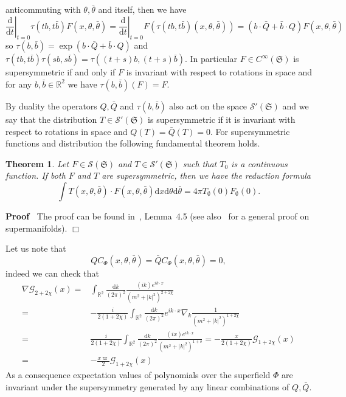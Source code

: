 \documentclass[a4paper,10pt]{article}
\newcommand{\mathd}{\mathrm{d}}
\newenvironment{proof}{\noindent\textbf{Proof\ }}{\hspace*{\fill}$\Box$\medskip}
\newtheorem{theorem}{Theorem}
\begin{document}
anticommuting with $\theta, \bar{\theta}$ and itself, then we have
\[ \left. \frac{\mathd}{\mathd t} \right|_{t = 0} \tau (t b, t \bar{b}) F (x,
   \theta, \bar{\theta}) = \left. \frac{\mathd}{\mathd t} \right|_{t = 0} F
   (\tau (t b, t \bar{b}) (x, \theta, \bar{\theta})) = (b \cdot \bar{Q} +
   \bar{b} \cdot Q) F (x, \theta, \bar{\theta}) \]
so $\tau (b, \bar{b}) = \exp (b \cdot \bar{Q} + \bar{b} \cdot Q)$ and $\tau (t
b, t \bar{b}) \tau (s b, s \bar{b}) = \tau ((t + s) b, (t + s) \bar{b})$. In
particular $F \in C^{\infty} (\mathfrak{S})$ is supersymmetric if and only if
$F$ is invariant with respect to rotations in space and for any $b, \bar{b}
\in \mathbb{R}^2$ we have $\tau (b, \bar{b}) (F) = F$.

By duality the operators $Q, \bar{Q}$ and $\tau (b, \bar{b})$ also act  on the
space $\mathcal{S}' (\mathfrak{S})$ and we say that the distribution $T \in
\mathcal{S}' (\mathfrak{S})$ is supersymmetric if it is invariant with respect
to rotations in space and $Q (T) = \bar{Q} (T) = 0$. For supersymmetric
functions and distribution the following fundamental theorem holds.

\begin{theorem}
  \label{theorem_supersymmetry1}Let $F \in \mathcal{S} (\mathfrak{S})$ and $T
  \in \mathcal{S}' (\mathfrak{S})$ such that $T_0$ is a continuous function.
  If both $F$ and $T$ are supersymmetric, then we have the reduction formula
  \begin{equation}
    \int T (x, \theta, \bar{\theta}) \cdot F (x, \theta, \bar{\theta}) \mathd
    x \mathd \theta \mathd \bar{\theta} = 4 \pi T_{\emptyset} (0)
    F_{\emptyset} (0) . \label{eq:key}
  \end{equation}
\end{theorem}

\begin{proof}
  The proof can be found in~{\cite{Klein1984}}, Lemma~4.5 (see
  also~{\cite{Zaboronsky1997}} for a general proof on supermanifolds).
\end{proof}

Let us note that
\[ Q C_{\Phi} (x, \theta, \bar{\theta}) = \bar{Q} C_{\Phi} (x, \theta,
   \bar{\theta}) = 0, \]
indeed we can check that
\begin{align*}
  \nabla \mathcal{G}_{2 + 2 \chi} (x) = & \int_{\mathbb{R}^2} \frac{\mathd
  k}{(2 \pi)^2}  \frac{(i k) e^{i k \cdot x}}{(m^2 + | k |^2)^{2 + 2 \chi}}\\
  = & - \frac{i}{2 (1 + 2 \chi)} \int_{\mathbb{R}^2} \frac{\mathd k}{(2
  \pi)^2} e^{i k \cdot x} \nabla_k  \frac{1}{(m^2 + | k |^2)^{1 + 2 \chi}}\\
  = & \frac{i}{2 (1 + 2 \chi)} \int_{\mathbb{R}^2} \frac{\mathd k}{(2 \pi)^2} 
  \frac{(i x) e^{i k \cdot x}}{(m^2 + | k |^2)^{1 + \delta}} = - \frac{x}{2 (1
  + 2 \chi)} \mathcal{G}_{1 + 2 \chi} (x)\\
  = & - \frac{x \varpi}{2} \mathcal{G}_{1 + 2 \chi} (x)
\end{align*}
As a consequence expectation values of polynomials over the superfield $\Phi$
are invariant under the supersymmetry generated by any linear combinations of
$Q, \bar{Q}$.
\end{document}
